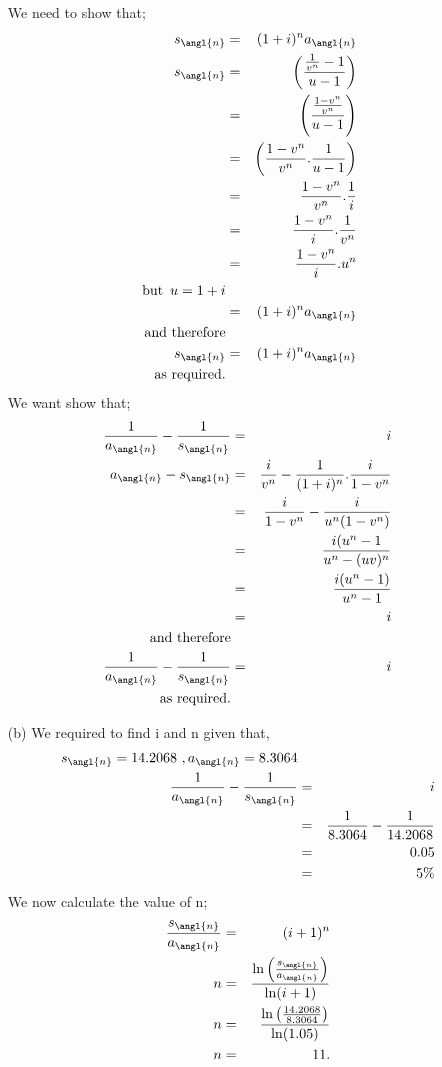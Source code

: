 \documentclass[12pt,a4paper]{article}
\begin{document}
\begin{enumerate}
We need to show that;
\begin{eqnarray*}
s_{\angl{n}}& =&(1+i)^n a_{\angl{n}}\\
s_{\angl{n}}&=& \left( \frac{\frac{1}{v^n}-1}{u-1}\right)\\
&=&\left( \frac{\frac{1-v^n}{v^n}}{u-1}\right)\\
&=&\left( \frac{1-v^n}{v^n}.\frac{1}{u-1}\right)\\
&=& \frac{1-v^n}{v^n}.\frac{1}{i}\\
&=& \frac{1-v^n}{i}.\frac{1}{v^n}\\
&=& \frac{1-v^n}{i}. u^n\\
\text{ but } \, u=1+i\\
&=& (1+i)^n a_{\angl{n}}\\
\text{and therefore}\\
s_{\angl{n}}& =&(1+i)^n a_{\angl{n}}\\
\text{as required.}
\end{eqnarray*}
We want show that;
\begin{eqnarray*}
\frac{1}{a_{\angl{n}}}-\frac{1}{s_{\angl{n}}} &=& i\\
a_{\angl{n}}-s_{\angl{n}} &=& \frac{i}{v^n}-\frac{1}{(1+i)^n}.\frac{i}{1-v^n}\\
 &=&\frac{i}{1-v^n}- \frac{i}{u^n(1-v^n)}\\
 &=& \frac{i(u^n-1}{u^n-(uv)^n}\\
  &=&\frac{i(u^n-1)}{u^n-1}\\
   &=& i\\
   \text{and therefore}\\
\frac{1}{a_{\angl{n}}}-\frac{1}{s_{\angl{n}}} &=& i\\
   \text{as required.}
\end{eqnarray*}
\item[(b)]
We required to find i and n given that,
\begin{eqnarray*}
s_{\angl{n}}=14.2068 \,\, ,a_{\angl{n}}=8.3064\\
\frac{1}{a_{\angl{n}}}-\frac{1}{s_{\angl{n}}} &=& i\\
&=&\frac{1}{8.3064}-\frac{1}{14.2068}\\
&=& 0.05\\
&=& 5\%
\end{eqnarray*}
We now calculate the value of n;
\begin{eqnarray*}
\frac{s_{\angl{n}}}{a_{\angl{n}}}&=& (i+1)^n\\
n&=&\frac{\ln \left( \frac{s_{\angl{n}}}{a_{\angl{n}}} \right)}{\ln (i+1)}\\
n&=&\frac{\ln \left( \frac{14.2068}{8.3064}\right)}{ \ln (1.05)}\\
n&=& 11.
\end{eqnarray*}
\end{enumerate}
\end{document}
